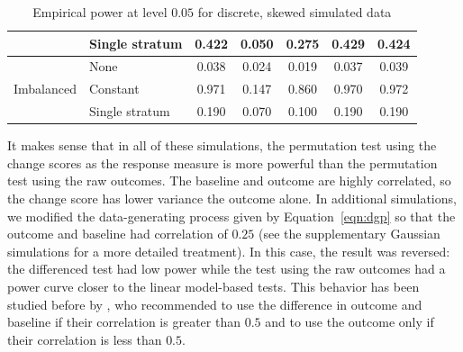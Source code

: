 \documentclass[12pt]{article}
\begin{document}
\begin{table}[]
\begin{tabular}{ll|ccccc}
                            & Single stratum                                              & 0.422                      & 0.050                                                                                & 0.275                                                                                 & 0.429                                                                        & 0.424                                                                        \\ \hline
\multirow{3}{*}{Imbalanced} & None                                                        & 0.038                      & 0.024                                                                                & 0.019                                                                                 & 0.037                                                                        & 0.039                                                                        \\
                            & Constant                                                    & 0.971                      & 0.147                                                                                & 0.860                                                                                 & 0.970                                                                        & 0.972                                                                        \\
                            & Single stratum                                              & 0.190                      & 0.070                                                                                & 0.100                                                                                 & 0.190                                                                        & 0.190                                                                        \\ \hline
\end{tabular}
\caption{Empirical power at level $0.05$ for discrete, skewed simulated data} 
\end{table}
It makes sense that in all of these simulations, the permutation test using the change scores as the response measure is more powerful than the permutation test using the raw outcomes.
The baseline and outcome are highly correlated, so the change score has lower variance the outcome alone.
In additional simulations, 
we modified the data-generating process given by Equation~\ref{eqn:dgp} so that the outcome and baseline had correlation of $0.25$ (see the supplementary Gaussian simulations for a more detailed treatment).
In this case, the result was reversed: 
the differenced test had low power while the test using the raw outcomes had a power curve closer to the linear model-based tests.
This behavior has been studied before by \cite{frison_repeated_1992}, who recommended to use the difference in outcome and baseline if their correlation is greater than $0.5$ and to use the outcome only if their correlation is less than $0.5$.
\end{document}

